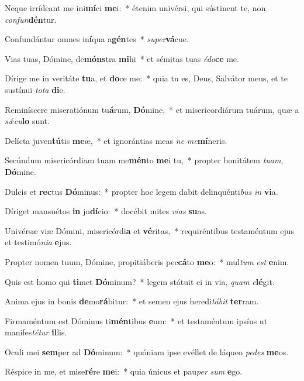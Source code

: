 \item Neque irrídeant me ini\textbf{mí}ci \textbf{me}i:~* étenim univérsi, qui sústinent te, non \textit{con}\textit{fun}\textbf{dén}tur.
\item Confundántur omnes in\textbf{í}qua a\textbf{gén}tes~* \textit{su}\textit{per}\textbf{vá}cue.
\item Vias tuas, Dómine, de\textbf{móns}tra \textbf{mi}hi~* et sémitas tuas \textit{é}\textit{do}\textbf{ce} me.
\item Dírige me in veritáte \textbf{tu}a, et \textbf{do}ce me:~* quia tu es, Deus, Salvátor meus, et te sustínui \textit{to}\textit{ta} \textbf{di}e.
\item Reminíscere miseratiónum tu\textbf{á}rum, \textbf{Dó}mine,~* et misericordiárum tuárum, quæ a \textit{sǽ}\textit{cu}\textbf{lo} sunt.
\item Delícta juven\textbf{tú}tis \textbf{me}æ,~* et ignorántias meas \textit{ne} \textit{me}\textbf{mí}neris.
\item Secúndum misericórdiam tuam me\textbf{mén}to \textbf{me}i tu,~* propter bonitátem \textit{tu}\textit{am}, \textbf{Dó}mine.
\item Dulcis et \textbf{rec}tus \textbf{Dó}minus:~* propter hoc legem dabit delinquénti\textit{bus} \textit{in} \textbf{vi}a.
\item Díriget mansuétos \textbf{in} ju\textbf{dí}cio:~* docébit mites \textit{vi}\textit{as} \textbf{su}as.
\item Univérsæ viæ Dómini, misericórdi\textbf{a} et \textbf{vé}ritas,~* requiréntibus testaméntum ejus et testimó\textit{ni}\textit{a} \textbf{e}jus.
\item Propter nomen tuum, Dómine, propitiáberis pec\textbf{cá}to \textbf{me}o:~* mul\textit{tum} \textit{est} \textbf{e}nim.
\item Quis est homo qui \textbf{ti}met \textbf{Dó}minum?~* legem státuit ei in via, \textit{quam} \textit{e}\textbf{lé}git.
\item Anima ejus in bonis \textbf{de}mo\textbf{rá}bitur:~* et semen ejus heredi\textit{tá}\textit{bit} \textbf{ter}ram.
\item Firmaméntum est Dóminus ti\textbf{mén}tibus \textbf{e}um:~* et testaméntum ipsíus ut manifes\textit{té}\textit{tur} \textbf{il}lis.
\item Oculi mei \textbf{sem}per ad \textbf{Dó}minum:~* quóniam ipse evéllet de láqueo \textit{pe}\textit{des} \textbf{me}os.
\item Réspice in me, et mise\textbf{ré}re \textbf{me}i:~* quia únicus et pau\textit{per} \textit{sum} \textbf{e}go.
